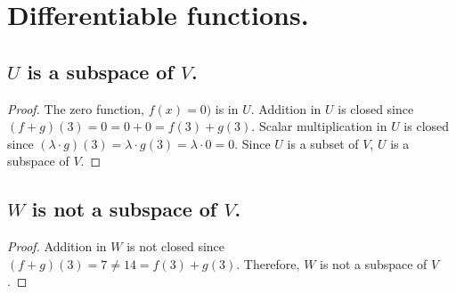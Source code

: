 \section{Differentiable functions.}
\subsection{$U$ is a subspace of $V$.}
\begin{proof}
    The zero function, $f(x) = 0)$ is in $U$.
    Addition in $U$ is closed since
    $(f+g)(3) = 0 = 0 + 0 = f(3) + g(3)$. 
    Scalar multiplication in $U$ is closed since
    $(\lambda \cdot g)(3) = \lambda \cdot g(3) = \lambda \cdot 0 = 0$.
    Since $U$ is a subset of $V$, $U$ is a subspace of $V$.
\end{proof}

\subsection{$W$ is not a subspace of $V$.}
\begin{proof}
    Addition in $W$ is not closed since
    $(f+g)(3) = 7 \neq 14 = f(3) + g(3)$.
    Therefore, $W$ is not a subspace of $V$.
\end{proof}